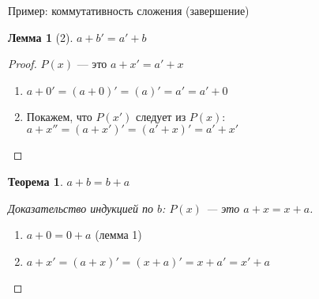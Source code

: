\documentclass[handout]{beamer}
\newtheorem{thm}{Теорема}[section]
\newtheorem{lmm}{Лемма}[section]
\begin{document}
\begin{frame}{Пример: коммутативность сложения (завершение)}
\begin{lmm}[2]
$a + b' = a' + b$
\end{lmm}\pause
\begin{proof} $P(x)$ --- это $a + x' = a' + x$\pause
\begin{enumerate}
\item $a + 0' = (a + 0)' = (a)' = a' = a' + 0$\pause
\item Покажем, что $P(x')$ следует из $P(x)$: $a + x'' = (a + x')' = (a' + x)' = a' + x'$
\end{enumerate}
\end{proof}\pause

\begin{thm}
$a + b = b + a$
\end{thm}\pause
\begin{proof}[Доказательство индукцией по $b$: $P(x)$ --- это $a + x = x + a$]
\begin{enumerate}
\item $a + 0 = 0 + a$ (лемма 1)\pause
\item $a + x' = (a + x)' = (x + a)' = x + a' = x' + a$
\end{enumerate}
\end{proof}
\end{frame}
\end{document}
